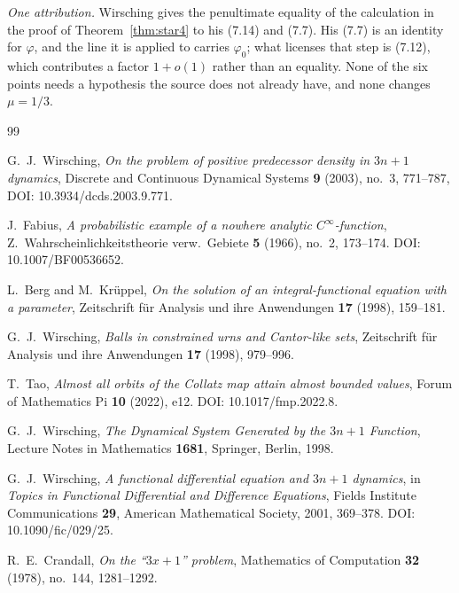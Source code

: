 \documentclass[11pt]{article}
\theoremstyle{definition}
\theoremstyle{remark}
\begin{document}
\emph{One attribution.} Wirsching gives the penultimate equality of the
calculation in the proof of Theorem~\ref{thm:star4} to his (7.14) and
(7.7). His (7.7) is an identity for
$\varphi$, and the line it is applied to carries $\varphi_0$; what
licenses that step is (7.12), which contributes a factor $1+o(1)$ rather
than an equality. None of the six points needs a hypothesis the source
does not already have, and none changes $\mu=1/3$.


\begin{thebibliography}{99}

 G.\ J.\ Wirsching, \emph{On the problem of
  positive predecessor density in $3n+1$ dynamics}, Discrete and
  Continuous Dynamical Systems \textbf{9} (2003), no.\ 3, 771--787,
  DOI: 10.3934/dcds.2003.9.771.

 J.\ Fabius, \emph{A probabilistic example of a
  nowhere analytic $C^\infty$-function}, Z.\ Wahrscheinlichkeitstheorie
  verw.\ Gebiete \textbf{5} (1966), no.\ 2, 173--174.
  DOI: 10.1007/BF00536652.

 L.\ Berg and M.\ Kr\"uppel, \emph{On the
  solution of an integral-functional equation with a parameter},
  Zeitschrift f\"ur Analysis und ihre Anwendungen \textbf{17} (1998),
  159--181.

 G.\ J.\ Wirsching, \emph{Balls in
  constrained urns and Cantor-like sets}, Zeitschrift f\"ur Analysis
  und ihre Anwendungen \textbf{17} (1998), 979--996.

 T.\ Tao, \emph{Almost all orbits of the Collatz map
  attain almost bounded values}, Forum of Mathematics Pi \textbf{10}
  (2022), e12. DOI: 10.1017/fmp.2022.8.

 G.\ J.\ Wirsching, \emph{The Dynamical
  System Generated by the $3n+1$ Function}, Lecture Notes in
  Mathematics \textbf{1681}, Springer, Berlin, 1998.

 G.\ J.\ Wirsching, \emph{A functional
  differential equation and $3n+1$ dynamics}, in \emph{Topics in
  Functional Differential and Difference Equations}, Fields Institute
  Communications \textbf{29}, American Mathematical Society, 2001,
  369--378. DOI: 10.1090/fic/029/25.

 R.\ E.\ Crandall, \emph{On the ``$3x+1$''
  problem}, Mathematics of Computation \textbf{32} (1978), no.\ 144,
  1281--1292.


\end{thebibliography}
\end{document}
